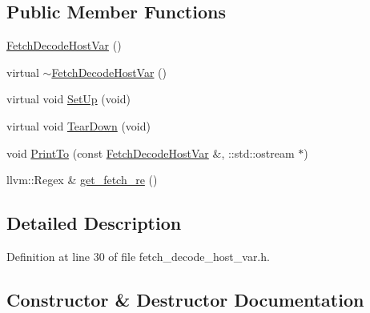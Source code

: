 \subsection*{Public Member Functions}
\begin{DoxyCompactItemize}
\item 
\hyperlink{classclang_1_1tidy_1_1pagesjaunes_1_1test_1_1_fetch_decode_host_var_a77f21c2fd82960461172393d9a4edc41}{Fetch\+Decode\+Host\+Var} ()
\item 
virtual \hyperlink{classclang_1_1tidy_1_1pagesjaunes_1_1test_1_1_fetch_decode_host_var_a9317f51cbc357407d8f942f5e15ba642}{$\sim$\+Fetch\+Decode\+Host\+Var} ()
\item 
virtual void \hyperlink{classclang_1_1tidy_1_1pagesjaunes_1_1test_1_1_fetch_decode_host_var_a879a617ca5c4546b2f63b4fe0986f73a}{Set\+Up} (void)
\item 
virtual void \hyperlink{classclang_1_1tidy_1_1pagesjaunes_1_1test_1_1_fetch_decode_host_var_a47f20a0ef0fe3b100ee05ddca4ef911a}{Tear\+Down} (void)
\item 
void \hyperlink{classclang_1_1tidy_1_1pagesjaunes_1_1test_1_1_fetch_decode_host_var_a4ffa3eb01a89fb7e76014822bb536cd2}{Print\+To} (const \hyperlink{classclang_1_1tidy_1_1pagesjaunes_1_1test_1_1_fetch_decode_host_var}{Fetch\+Decode\+Host\+Var} \&, \+::std\+::ostream $\ast$)
\item 
llvm\+::\+Regex \& \hyperlink{classclang_1_1tidy_1_1pagesjaunes_1_1test_1_1_fetch_decode_host_var_af0fe719b55f4bee9a190470cf326c9e0}{get\+\_\+fetch\+\_\+re} ()
\end{DoxyCompactItemize}


\subsection{Detailed Description}


Definition at line 30 of file fetch\+\_\+decode\+\_\+host\+\_\+var.\+h.



\subsection{Constructor \& Destructor Documentation}
\mbox{\label{classclang_1_1tidy_1_1pagesjaunes_1_1test_1_1_fetch_decode_host_var_a77f21c2fd82960461172393d9a4edc41}} 
